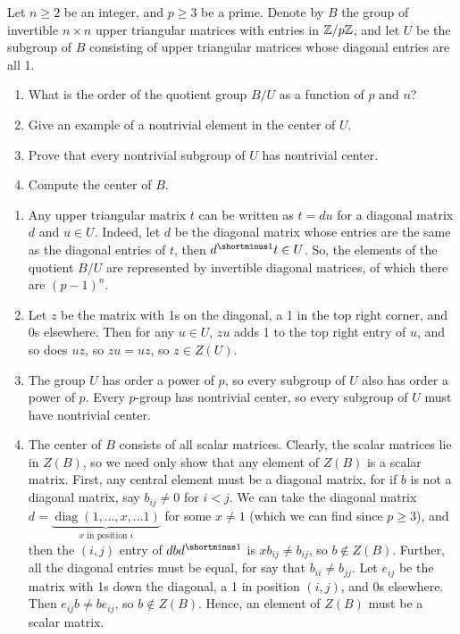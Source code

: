 %
\begin{question}[subtitle=January 2025 Problem 2,ID=Jan25_2]
Let $n \geq 2$ be an integer, and $p \geq 3$ be a prime. Denote by $B$ the group of invertible $n \times n$ upper triangular matrices with entries in $\mathbb{Z}/p\mathbb{Z}$, and let $U$ be the subgroup of $B$ consisting of upper triangular matrices whose diagonal entries are all 1.
\begin{enumerate}
    \item What is the order of the quotient group $B/U$ as a function of $p$ and $n$?
    \item Give an example of a nontrivial element in the center of $U$.
    \item Prove that every nontrivial subgroup of $U$ has nontrivial center.
    \item Compute the center of $B$.
\end{enumerate}
\end{question}
\begin{solution}
\begin{enumerate}
    \item Any upper triangular matrix $t$ can be written as $t = du$ for a diagonal matrix $d$ and $u \in U$. Indeed, let $d$ be the diagonal matrix whose entries are the same as the diagonal entries of $t$, then $d\inv t \in U$. So, the elements of the quotient $B/U$ are represented by invertible diagonal matrices, of which there are $(p-1)^n$.
    \item Let $z$ be the matrix with 1s on the diagonal, a 1 in the top right corner, and 0s elsewhere. Then for any $u \in U$, $zu$ adds 1 to the top right entry of $u$, and so does $uz$, so $zu = uz$, so $z \in Z(U)$.
    \item The group $U$ has order a power of $p$, so every subgroup of $U$ also has order a power of $p$. Every $p$-group has nontrivial center, so every subgroup of $U$ must have nontrivial center.
    \item The center of $B$ consists of all scalar matrices. Clearly, the scalar matrices lie in $Z(B)$, so we need only show that any element of $Z(B)$ is a scalar matrix. First, any central element must be a diagonal matrix, for if $b$ is not a diagonal matrix, say $b_{ij} \neq 0$ for $i < j$. We can take the diagonal matrix $d = \underbrace{\operatorname{diag}(1,\dots,x,\dots 1)}_{\text{$x$ in position $i$}}$ for some $x \neq 1$ (which we can find since $p \geq 3$), and then the $(i,j)$ entry of $dbd\inv$ is $xb_{ij} \neq b_{ij}$, so $b \notin Z(B)$. Further, all the diagonal entries must be equal, for say that $b_{ii} \neq b_{jj}$. Let $e_{ij}$ be the matrix with 1s down the diagonal, a 1 in position $(i,j)$, and 0s elsewhere. Then $e_{ij} b \neq b e_{ij}$, so $b \notin Z(B)$. Hence, an element of $Z(B)$ must be a scalar matrix.
\end{enumerate}
\end{solution}

